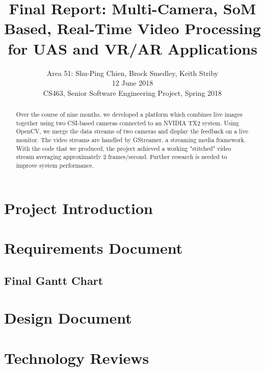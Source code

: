 \documentclass[letterpaper,10pt,serif,draftclsnofoot,onecolumn,compsoc,titlepage]{IEEEtran}
\title{Final Report: Multi-Camera, SoM Based, Real-Time Video Processing for UAS and VR/AR Applications}
\author{Area 51: Shu-Ping Chien, Brock Smedley, Keith Striby \\ 12 June 2018 \\ CS463, Senior Software Engineering Project, Spring 2018}
\begin{document}
\begin{titlepage}
\maketitle

\begin{abstract}
Over the course of nine months, we developed a platform which combines live images together using two CSI-based cameras connected to an NVIDIA TX2 system. Using OpenCV, we merge the data streams of two cameras and display the feedback on a live monitor. The video streams are handled by GStreamer, a streaming media framework. With the code that we produced, the project achieved a working "stitched" video stream averaging approximately 2 frames/second. Further research is needed to improve system performance.

\thispagestyle{empty}
\end{abstract}
\end{titlepage}

\newpage
\tableofcontents

\newpage

\section{Project Introduction}

	

\newpage

\section{Requirements Document}

	
\newpage

\subsection{Final Gantt Chart}

	

\newpage

\section{Design Document}

	

\newpage

\section{Technology Reviews}
\end{document}
